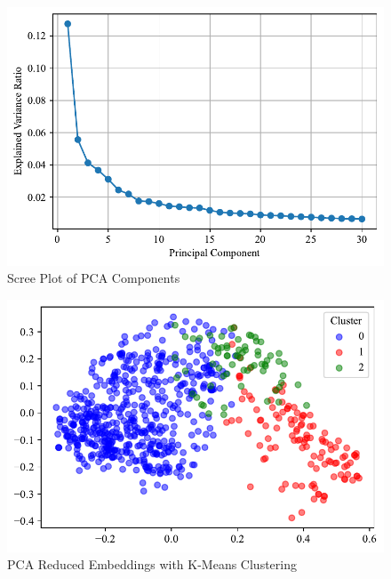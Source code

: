 \documentclass[12pt,english,hyperfootnotes=false,hidelinks]{article}
\begin{document}
\pagebreak

\begin{figure}[H]
\caption{Scree Plot of PCA Components} \label{fig_scree_plot}
\vspace{-0.5cm}
\begin{center}
\includegraphics[width=\textwidth]{figures/fig_scree_plot.pdf}
\end{center}
\end{figure}

\pagebreak


\begin{figure}[H]
\caption{PCA Reduced Embeddings with K-Means Clustering} \label{fig_clusters}
\vspace{-0.5cm}
\begin{center}
\includegraphics[width=\textwidth]{figures/fig_clusters.pdf}
\end{center}
\end{figure}
\end{document}
